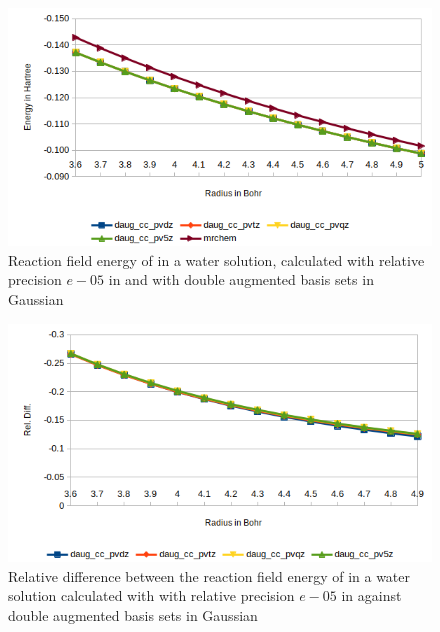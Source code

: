\documentclass[../Thesis.tex]{subfiles}
\begin{document}
\begin{figure}[!htb]
  \centering
    \includegraphics[width=0.75\linewidth]{img/Erdauglip.png}
  \caption[Reaction field energy of ]{Reaction field energy of  in a water solution, calculated with relative precision $e-05$ in \mrchem  and with double augmented basis sets in Gaussian}
  \label{fig:lipEnergyplotsdaug}
\end{figure}



\begin{figure}[!htb]
  \centering
    \includegraphics[width=\linewidth]{img/watdaugreldiff.png}
  \caption[Relative difference of  against Gaussian double augmented results]{Relative difference between the reaction field energy of  in a water solution calculated with with relative precision $e-05$ in \mrchem
   against double augmented basis sets in Gaussian}
  \label{fig:watreldiffdaug}
\end{figure}
\end{document}

